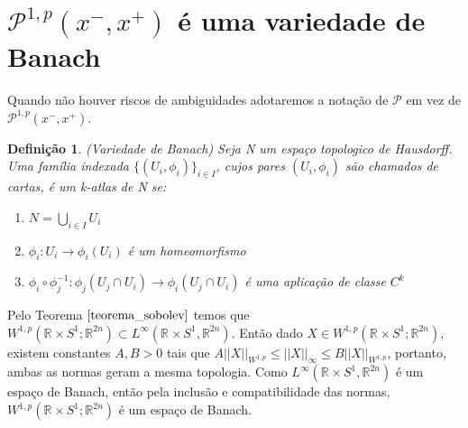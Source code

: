 \documentclass[12pt]{book}
\newtheorem{definicao}[teorema]{Definição}
\newcommand{\caminhosexponenciaisconectantesabrev}{\mathcal{P}}
\newcommand{\caminhosexponenciaisconectantes}[2]{\mathcal{P}^{1,p}(#1, #2)}
\newcommand{\caminhosexponenciaisconectantespadrao}{\caminhosexponenciaisconectantes{x^{-}}{x^{+}}}
\newcommand{\circulo}{S^{1}}
\newcommand{\espacosobolevcontradominio}[2]{W^{1,p}(#1;#2)}
\newcommand{\norma}[1]{||#1||}
\newcommand{\normaWp}[1]{||#1||_{W^{1,p}}}
\newcommand{\retacartesianocirculo}{\real{} \times \circulo}
\newcommand{\real}[1]{\mathbb{R}^{#1}}
\begin{document}
	\section{$\caminhosexponenciaisconectantespadrao$ é uma variedade de Banach}
	
	Quando não houver riscos de ambiguidades adotaremos a notação de $\caminhosexponenciaisconectantesabrev$ em vez de $\caminhosexponenciaisconectantespadrao$.
	
	\begin{definicao}
		(Variedade de Banach) Seja N um espaço topologico de Hausdorff. Uma família indexada $\{(U_{i}, \phi_{i})\}_{i \in I}$, cujos pares $(U_{i}, \phi_{i})$ são chamados de cartas, é um k-atlas de N se:
		\begin{enumerate}
			\item $N=\bigcup_{i\in I} U_{i}$
			\item $\phi_{i}:U_{i} \to \phi_{i}(U_{i})$ é um homeomorfismo
			\item $\phi_{i}\circ \phi_{j}^{-1}: \phi_{j}(U_{j}\cap U_{i}) \to \phi_{i}(U_{j}\cap U_{i}) $ é uma aplicação de classe $C^{k}$
		\end{enumerate}
	\end{definicao}
	
	Pelo Teorema $\ref{teorema_sobolev}$ temos que $\espacosobolevcontradominio{\retacartesianocirculo}{\real{2n}} \subset L^{\infty}(\retacartesianocirculo, \real{2n})$. Então dado $X \in \espacosobolevcontradominio{\retacartesianocirculo}{\real{2n}}$, existem constantes $A, B >0$ tais que $A\normaWp{X}\leq \norma{X}_{\infty} \leq B\normaWp{X}$, portanto, ambas as normas geram a mesma topologia. Como $L^{\infty}(\retacartesianocirculo, \real{2n})$ é um espaço de Banach, então pela inclusão e compatibilidade das normas, $\espacosobolevcontradominio{\retacartesianocirculo}{\real{2n}}$ é um espaço de Banach.
	
\end{document}
